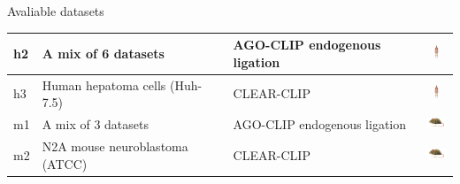 \documentclass{beamer}
\begin{document}
\begin{frame}{Avaliable datasets}
\begin{table}[h!]
{\begin{tabular}{|l|p{5cm}|p{4cm}|c|}
    h2 &
	A mix of 6 datasets & 
	AGO-CLIP endogenous ligation &  
	\includegraphics[height=0.4cm]{images/human.png} \\
	\hline
	
    h3 &
	Human hepatoma cells (Huh-7.5) & 
	CLEAR-CLIP & 
	\includegraphics[height=0.4cm]{images/human.png} \\
	\hline
	
    m1 &
	A mix of 3 datasets & 
	AGO-CLIP endogenous ligation & 
	 \includegraphics[height=0.4cm]{images/mosmus.jpg} \\
	\hline
	
    m2 &
	N2A mouse neuroblastoma (ATCC) & 
	CLEAR-CLIP & 
	\includegraphics[height=0.4cm]{images/mosmus.jpg} \\
	\hline
\end{tabular}}
\end{table}


\end{frame}
\end{document}
